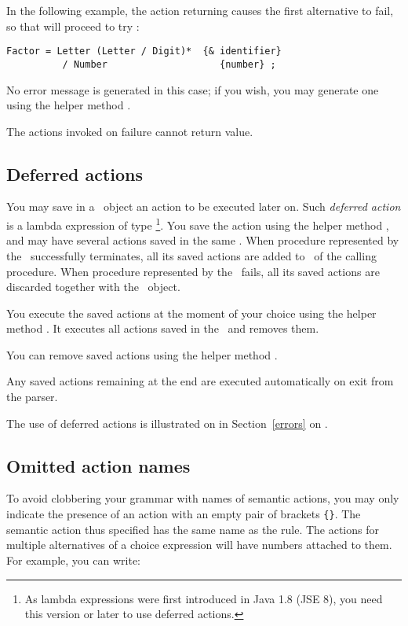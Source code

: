 In the following example, 
the action  returning  causes the first alternative to fail,
so that  will proceed to try :

\small
\begin{Verbatim}[frame=single,framesep=2mm,samepage=true,xleftmargin=15mm,xrightmargin=15mm,baselinestretch=0.8]
   Factor = Letter (Letter / Digit)*  {& identifier} 
          / Number                    {number} ;
\end{Verbatim}
\normalsize

No error message is generated in this case; if you wish, you may generate one
using the helper method .

The actions invoked on failure cannot return  value.


\subsection{Deferred actions\label{DefAct}}

You may save in a \Phrase\ object an action to be executed later on.
Such \textit{deferred action} is a lambda expression of type \footnote{
As lambda expressions were first introduced in Java 1.8 (JSE 8), you
need this version or later to use deferred actions.}.  
You save the action using the helper method ,
and may have several actions saved in the same \Phrase.
When procedure represented by the \Phrase\ successfully terminates,
all its saved actions are added to \Phrase\ of the calling procedure. 
When procedure represented by the \Phrase\ fails, all its saved actions
are discarded together with the \Phrase\ object.

You execute the saved actions at the moment of your choice
using the helper method .
It executes all actions saved in the \Phrase\ and removes them.

You can remove saved actions using the helper method .

Any saved actions remaining at the end are executed automatically 
on exit from the parser.

The use of deferred actions is illustrated on in Section~\ref{errors} on .


\subsection{Omitted action names}

To avoid clobbering your grammar with names of semantic actions, 
you may only indicate the presence of an action with an empty pair of brackets \verb#{}#.
The semantic action thus specified has the same name as the rule.
The actions for multiple alternatives of a choice expression will have numbers attached to them.
For example, you can write:

